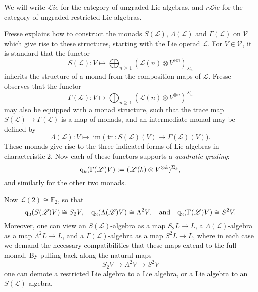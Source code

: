\documentclass[11pt]{amsart}
\theoremstyle{plain}
\theoremstyle{definition}
\DeclareMathOperator{\im}{im}
\DeclareMathOperator{\trace}{tr}
\renewcommand{\to}{\longrightarrow}
\newcommand{\scrL}{\mathscr{L}}
\newcommand{\calV}{\mathcal{V}}
\theoremstyle{plain}
\newcommand{\LieOperad}{{\scrL}}
\newcommand{\vect}[2]{\calV^{#1}_{#2}}
\newcommand{\quadgrad}[1]{\textup{q}_{#1}}
\newcommand{\F}{\mathbb{F}}
\newcommand{\liealgs}{{\scrL\!\textit{ie}}}
\newcommand{\restliealgs}{{\textit{r}\scrL\!\textit{ie}}}
\begin{document}
\begin{Conventions and notation}
We will  write $\liealgs$ for the category of ungraded Lie algebras, and $\restliealgs$ for the category of ungraded restricted Lie algebras.

Fresse \cite{FresseSimplicialAlgs.pdf} explains how to construct the monads $S(\LieOperad)$, $\Lambda(\LieOperad)$ and $\Gamma(\LieOperad)$ on $\vect{}{}$ which give rise to these structures, starting with the Lie operad $\LieOperad$. For $V\in\vect{}{}$, it is standard that the functor
\[S(\LieOperad):V\mapsto \bigoplus_{n\geq1}(\LieOperad(n)\otimes V^{\otimes n})_{\Sigma_n}\]
inherits the structure of a monad from the composition maps of $\LieOperad$. Fresse observes that the functor
\[\Gamma(\LieOperad):V\mapsto \bigoplus_{n\geq1}(\LieOperad(n)\otimes V^{\otimes n})^{\Sigma_n}\]
may also be equipped with a monad structure, such that the trace map $S(\LieOperad)\to \Gamma(\LieOperad)$
is a map of monads, and an intermediate monad may be defined by
\[\Lambda(\LieOperad):V\mapsto\im\bigl(\trace:S(\LieOperad)(V)\to \Gamma(\LieOperad)(V)\bigr).\]
These monads give rise to the three indicated forms of Lie algebras in characteristic 2. Now each of these functors supports a \emph{quadratic grading}:
\[\quadgrad{k}(\Gamma(\LieOperad)V):=(\LieOperad(k)\otimes V^{\otimes k})^{\Sigma_k},\]
and similarly for the other two monads.

 Now $\LieOperad(2)\cong\F_2$, so that
\[\quadgrad{2}(S(\LieOperad)V)\cong S_2V,\quad \quadgrad{2}(\Lambda(\LieOperad)V)\cong \Lambda^2V,\quad\textup{and}\quad\quadgrad{2}(\Gamma(\LieOperad)V)\cong S^2V.\]
Moreover, one can view an $S(\LieOperad)$-algebra as a map $S_2L\to L$, a $\Lambda(\LieOperad)$-algebra as a map $\Lambda^2L\to L$, and a $\Gamma(\LieOperad)$-algebra as a map $S^2L\to L$, where in each case we demand the necessary compatibilities that these maps extend to the full monad. %
By pulling back along the natural maps
\[S_2V\to \Lambda^2 V\to S^2V\]
one can demote a restricted Lie algebra to a Lie algebra, or a Lie algebra to an $S(\LieOperad)$-algebra.


\end{Conventions and notation}
\end{document}
